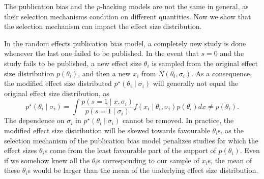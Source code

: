 \documentclass[useAMS,usenatbib,referee]{biom}
\begin{document}
The publication bias and the $p$-hacking models are not the same in general, as their selection mechanisms condition on different quantities. Now we show that the selection mechanism can impact the effect size distribution.

In the random effects publication bias model, a completely new study is done whenever the last one failed to be published. In the event that $s=0$ and the study fails to be published, a new effect size $\theta_i$ is sampled from the original effect size distribution $p(\theta_i)$, and then a new $x_i$ from $N(\theta_i,\sigma_i)$. As a consequence, the modified effect size distributed $p^\star(\theta_i\mid \sigma_i)$ will generally not equal the original effect size distribution, as
\[
p^\star(\theta_i\mid \sigma_i)=\int\frac{p(s=1\mid x, \sigma_i)}{p(s=1\mid\sigma_i)}f(x_i \mid \theta_i, \sigma _i) p(\theta_i) dx\neq p(\theta_i).
\]
The dependence on $\sigma_i$ in $p^\star(\theta_i\mid \sigma_i)$ cannot be removed. In practice, the modified effect size distribution will be skewed towards favourable $\theta_i$s, as the selection mechanism of the publication bias model penalizes studies for which the effect sizes $\theta_i$s come from the least favourable part of the support of $p(\theta_i)$. Even if we somehow knew all the $\theta_i$s corresponding to our sample of $x_i$s, the mean of these $\theta_i$s would be larger than the mean of the underlying effect size distribution. %


\end{document}
